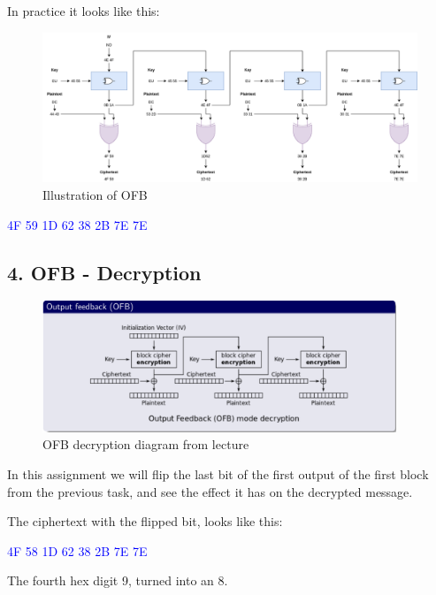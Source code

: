 \documentclass{article}
\begin{document}
In practice it looks like this:
\begin{figure}[H]
 \centering
  \includegraphics[width=400pt]{img/OFB.png}
 \caption{Illustration of OFB}
 \end{figure}

\begin{tcolorbox}
\begin{center}
\textcolor{blue}{
\qquad 4F 59 1D 62 38 2B 7E 7E}
\end{center}
\end{tcolorbox}


\newpage
\subsection{4. OFB - Decryption}

\begin{figure}[H]
 \centering
  \includegraphics[width=300pt]{img/ofbDeLecture.png}
 \caption{OFB decryption diagram from lecture}
 \end{figure}

In this assignment we will flip the last bit of the first output of the first block from the previous task, and see the effect it has on the decrypted message. 

The ciphertext with the flipped bit, looks like this: 
\begin{tcolorbox}
\begin{center}
\textcolor{blue}{
\qquad 4F 58 1D 62 38 2B 7E 7E}
\end{center}
\end{tcolorbox}
The fourth hex digit 9, turned into an 8.
\end{document}
